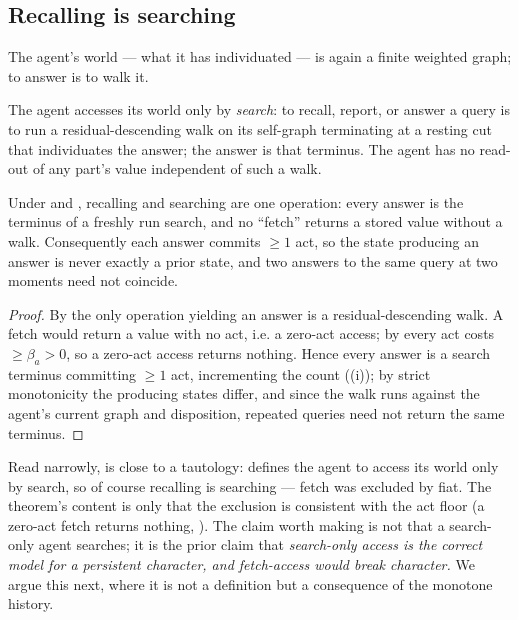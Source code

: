 \documentclass[11pt,twocolumn,a4paper]{article}
\newcommand{\floorc}{\beta}          %
\begin{document}
\subsection{Recalling is searching}

The agent's world --- what it has individuated --- is again a finite
weighted graph; to answer is to walk it.

\begin{definition}
\label{def:search}
The agent accesses its world only by \emph{search}: to recall, report, or
answer a query is to run a residual-descending walk on its self-graph
terminating at a resting cut that individuates the answer; the answer is
that terminus. The agent has no read-out of any part's value independent
of such a walk.
\end{definition}

\begin{theorem}
\label{thm:recsearch}
Under  and , recalling and searching
are one operation: every answer is the terminus of a freshly run search,
and no ``fetch'' returns a stored value without a walk. Consequently each
answer commits $\ge1$ act, so the state producing an answer is never
exactly a prior state, and two answers to the same query at two moments
need not coincide.
\end{theorem}

\begin{proof}
By  the only operation yielding an answer is a
residual-descending walk. A fetch would return a value with no act, i.e. a
zero-act access; by  every act costs $\ge\floorc_a>0$,
so a zero-act access returns nothing. Hence every answer is a search
terminus committing $\ge1$ act, incrementing the count
((i)); by strict monotonicity the producing states
differ, and since the walk runs against the agent's current graph and
disposition, repeated queries need not return the same terminus.
\end{proof}

\begin{remark}
\label{rem:recsearch-honest}
Read narrowly,  is close to a tautology:
 defines the agent to access its world only by search, so
of course recalling is searching --- fetch was excluded by fiat. The
theorem's content is only that the exclusion is consistent with the act
floor (a zero-act fetch returns nothing, ). The claim
worth making is not that a search-only agent searches; it is the prior
claim that \emph{search-only access is the correct model for a persistent
character, and fetch-access would break character.} We argue this next,
where it is not a definition but a consequence of the monotone history.
\end{remark}
\end{document}
